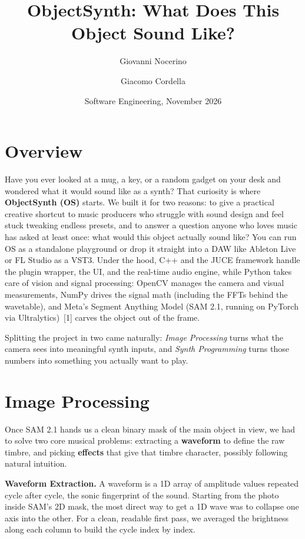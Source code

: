 \documentclass[10pt,a4paper]{article}
\title{\vspace{-2.4em}\textbf{ObjectSynth}: What Does This Object Sound Like?}
\author{Giovanni Nocerino \and Giacomo Cordella}
\date{\vspace{-0.8em}Software Engineering, November 2026}
\begin{document}
\maketitle
\vspace{-1.8em}

\section*{Overview}
Have you ever looked at a mug, a key, or a random gadget on your desk and wondered what it would sound like as a synth? That curiosity is where \textbf{ObjectSynth (OS)} starts. We built it for two reasons: to give a practical creative shortcut to music producers who struggle with sound design and feel stuck tweaking endless presets, and to answer a question anyone who loves music has asked at least once: what would this object actually sound like? You can run OS as a standalone playground or drop it straight into a DAW like Ableton Live or FL Studio as a VST3. Under the hood, C++ and the JUCE framework handle the plugin wrapper, the UI, and the real-time audio engine, while Python takes care of vision and signal processing: OpenCV manages the camera and visual measurements, NumPy drives the signal math (including the FFTs behind the wavetable), and Meta's Segment Anything Model (SAM 2.1, running on PyTorch via Ultralytics)~[1] carves the object out of the frame.

Splitting the project in two came naturally: \emph{Image Processing} turns what the camera sees into meaningful synth inputs, and \emph{Synth Programming} turns those numbers into something you actually want to play.

\section*{Image Processing}
Once SAM 2.1 hands us a clean binary mask of the main object in view, we had to solve two core musical problems: extracting a \textbf{waveform} to define the raw timbre, and picking \textbf{effects} that give that timbre character, possibly following natural intuition.

\textbf{Waveform Extraction.} A waveform is a 1D array of amplitude values repeated cycle after cycle, the sonic fingerprint of the sound. Starting from the photo inside SAM's 2D mask, the most direct way to get a 1D wave was to collapse one axis into the other. For a clean, readable first pass, we averaged the brightness along each column to build the cycle index by index.
\end{document}
